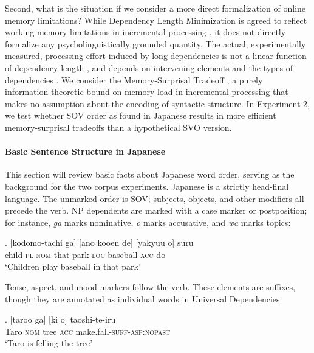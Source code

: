 \documentclass[11pt,a4paper]{article}
\begin{document}
Second, what is the situation  %
if we consider a more direct formalization of online memory limitations?
While Dependency Length Minimization is agreed to reflect working memory limitations in incremental processing \citep{hawkins1994performance, futrell2015largescale, temperley2018minimizing}, it does not directly formalize any psycholinguistically grounded quantity.
The actual, experimentally measured, processing effort induced by long dependencies is not a linear function of dependency length \citep{gibson1998linguistic}, and depends on intervening elements \citep{gibson1998linguistic, lewis-activation-based-2005} and the types of dependencies \citep{demberg-data-2008}.
We consider  %
the Memory-Surprisal Tradeoff \citep{hahn2019memory}, a purely information-theoretic bound on memory load in incremental processing that makes no assumption about the encoding of syntactic structure.
In Experiment 2, we test whether SOV order as found in Japanese results in more efficient memory-surprisal tradeoffs than a hypothetical SVO version.

\paragraph{Basic Sentence Structure in Japanese}
This section will review basic facts about Japanese word order, serving as the background for the two corpus experiments.
Japanese is a strictly head-final language. The unmarked order is SOV; subjects, objects, and other modifiers all precede the verb.
NP dependents are marked with a case marker or postposition; for instance, \emph{ga} marks nominative, \emph{o} marks accusative, and \emph{wa} marks topics:


\exg. [kodomo-tachi ga] [ano kooen de] [yakyuu o] suru \\
child-\textsc{pl} \textsc{nom} that park \textsc{loc} baseball \textsc{acc} do \\
`Children play baseball in that park' \citep[p. 118]{iwasaki2013japanese}

Tense, aspect, and mood markers follow the verb.
These elements are suffixes, though they are annotated as individual words in Universal Dependencies:

\exg. [taroo ga] [ki o] taoshi-te-iru \\
Taro \textsc{nom} tree \textsc{acc} make.fall-\textsc{suff}-\textsc{asp:nopast} \\
`Taro is felling the tree' \citep[p. 138]{iwasaki2013japanese} \label{ex:taro-tree}
\end{document}

